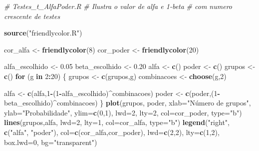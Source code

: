 \documentclass[]{article}
\newenvironment{Shaded}{\begin{snugshade}}{\end{snugshade}}
\newcommand{\KeywordTok}[1]{\textcolor[rgb]{0.13,0.29,0.53}{\textbf{#1}}}
\newcommand{\DataTypeTok}[1]{\textcolor[rgb]{0.13,0.29,0.53}{#1}}
\newcommand{\DecValTok}[1]{\textcolor[rgb]{0.00,0.00,0.81}{#1}}
\newcommand{\FloatTok}[1]{\textcolor[rgb]{0.00,0.00,0.81}{#1}}
\newcommand{\StringTok}[1]{\textcolor[rgb]{0.31,0.60,0.02}{#1}}
\newcommand{\CommentTok}[1]{\textcolor[rgb]{0.56,0.35,0.01}{\textit{#1}}}
\newcommand{\ControlFlowTok}[1]{\textcolor[rgb]{0.13,0.29,0.53}{\textbf{#1}}}
\newcommand{\OperatorTok}[1]{\textcolor[rgb]{0.81,0.36,0.00}{\textbf{#1}}}
\newcommand{\NormalTok}[1]{#1}
\begin{document}
\begin{Shaded}
\begin{Highlighting}[]
\CommentTok{# Testes_t_AlfaPoder.R}
\CommentTok{# Ilustra o valor de alfa e 1-beta}
\CommentTok{# com numero crescente de testes }

\KeywordTok{source}\NormalTok{(}\StringTok{"friendlycolor.R"}\NormalTok{)}

\NormalTok{cor_alfa <-}\StringTok{ }\KeywordTok{friendlycolor}\NormalTok{(}\DecValTok{8}\NormalTok{)}
\NormalTok{cor_poder <-}\StringTok{ }\KeywordTok{friendlycolor}\NormalTok{(}\DecValTok{20}\NormalTok{)}

\NormalTok{alfa_escolhido <-}\StringTok{ }\FloatTok{0.05}
\NormalTok{beta_escolhido <-}\StringTok{ }\FloatTok{0.20}
\NormalTok{alfa <-}\StringTok{ }\KeywordTok{c}\NormalTok{()}
\NormalTok{poder <-}\StringTok{ }\KeywordTok{c}\NormalTok{()}
\NormalTok{grupos <-}\StringTok{ }\KeywordTok{c}\NormalTok{()}
\ControlFlowTok{for}\NormalTok{ (g }\ControlFlowTok{in} \DecValTok{2}\OperatorTok{:}\DecValTok{20}\NormalTok{)}
\NormalTok{\{}
\NormalTok{  grupos <-}\StringTok{ }\KeywordTok{c}\NormalTok{(grupos,g)}
\NormalTok{  combinacoes <-}\StringTok{ }\KeywordTok{choose}\NormalTok{(g,}\DecValTok{2}\NormalTok{)}
  
\NormalTok{  alfa <-}\StringTok{ }\KeywordTok{c}\NormalTok{(alfa,}\DecValTok{1}\OperatorTok{-}\NormalTok{(}\DecValTok{1}\OperatorTok{-}\NormalTok{alfa_escolhido)}\OperatorTok{^}\NormalTok{combinacoes)}
\NormalTok{  poder <-}\StringTok{ }\KeywordTok{c}\NormalTok{(poder,(}\DecValTok{1}\OperatorTok{-}\NormalTok{beta_escolhido)}\OperatorTok{^}\NormalTok{combinacoes)}
\NormalTok{\}}
\KeywordTok{plot}\NormalTok{(grupos, poder,}
     \DataTypeTok{xlab=}\StringTok{"Número de grupos"}\NormalTok{,}
     \DataTypeTok{ylab=}\StringTok{"Probabilidade"}\NormalTok{,}
     \DataTypeTok{ylim=}\KeywordTok{c}\NormalTok{(}\DecValTok{0}\NormalTok{,}\DecValTok{1}\NormalTok{),}
     \DataTypeTok{lwd=}\DecValTok{2}\NormalTok{, }\DataTypeTok{lty=}\DecValTok{2}\NormalTok{, }\DataTypeTok{col=}\NormalTok{cor_poder,}
     \DataTypeTok{type=}\StringTok{"b"}\NormalTok{)}
\KeywordTok{lines}\NormalTok{(grupos,alfa,}
      \DataTypeTok{lwd=}\DecValTok{2}\NormalTok{, }\DataTypeTok{lty=}\DecValTok{1}\NormalTok{, }\DataTypeTok{col=}\NormalTok{cor_alfa, }
      \DataTypeTok{type=}\StringTok{"b"}\NormalTok{)}
\KeywordTok{legend}\NormalTok{(}\StringTok{"right"}\NormalTok{,}
       \KeywordTok{c}\NormalTok{(}\StringTok{"alfa"}\NormalTok{, }\StringTok{"poder"}\NormalTok{),}
       \DataTypeTok{col=}\KeywordTok{c}\NormalTok{(cor_alfa,cor_poder),}
       \DataTypeTok{lwd=}\KeywordTok{c}\NormalTok{(}\DecValTok{2}\NormalTok{,}\DecValTok{2}\NormalTok{),}
       \DataTypeTok{lty=}\KeywordTok{c}\NormalTok{(}\DecValTok{1}\NormalTok{,}\DecValTok{2}\NormalTok{),}
       \DataTypeTok{box.lwd=}\DecValTok{0}\NormalTok{, }\DataTypeTok{bg=}\StringTok{"transparent"}\NormalTok{)}
\end{Highlighting}
\end{Shaded}
\end{document}

